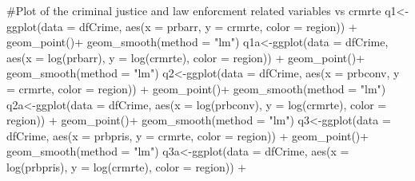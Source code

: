 \documentclass[]{article}
\newenvironment{Shaded}{}{}
\newcommand{\CommentTok}[1]{\textcolor[rgb]{0.00,0.50,0.00}{#1}}
\newcommand{\DataTypeTok}[1]{#1}
\newcommand{\KeywordTok}[1]{\textcolor[rgb]{0.00,0.00,1.00}{#1}}
\newcommand{\NormalTok}[1]{#1}
\newcommand{\OperatorTok}[1]{#1}
\newcommand{\StringTok}[1]{\textcolor[rgb]{0.00,0.50,0.50}{#1}}
\begin{document}
\begin{Shaded}
\begin{Highlighting}[]
\CommentTok{#Plot of the criminal justice and law enforcment related variables vs crmrte}
\NormalTok{q1<-}\KeywordTok{ggplot}\NormalTok{(}\DataTypeTok{data =}\NormalTok{ dfCrime, }\KeywordTok{aes}\NormalTok{(}\DataTypeTok{x =}\NormalTok{ prbarr, }\DataTypeTok{y =}\NormalTok{ crmrte, }\DataTypeTok{color =}\NormalTok{ region)) }\OperatorTok{+}\StringTok{ }
\StringTok{      }\KeywordTok{geom_point}\NormalTok{()}\OperatorTok{+}
\StringTok{  }\KeywordTok{geom_smooth}\NormalTok{(}\DataTypeTok{method =} \StringTok{"lm"}\NormalTok{)}
\NormalTok{q1a<-}\KeywordTok{ggplot}\NormalTok{(}\DataTypeTok{data =}\NormalTok{ dfCrime, }\KeywordTok{aes}\NormalTok{(}\DataTypeTok{x =} \KeywordTok{log}\NormalTok{(prbarr), }\DataTypeTok{y =} \KeywordTok{log}\NormalTok{(crmrte), }\DataTypeTok{color =}\NormalTok{ region)) }\OperatorTok{+}\StringTok{ }
\StringTok{      }\KeywordTok{geom_point}\NormalTok{()}\OperatorTok{+}
\StringTok{  }\KeywordTok{geom_smooth}\NormalTok{(}\DataTypeTok{method =} \StringTok{"lm"}\NormalTok{)}
\NormalTok{q2<-}\KeywordTok{ggplot}\NormalTok{(}\DataTypeTok{data =}\NormalTok{ dfCrime, }\KeywordTok{aes}\NormalTok{(}\DataTypeTok{x =}\NormalTok{ prbconv, }\DataTypeTok{y =}\NormalTok{ crmrte, }\DataTypeTok{color =}\NormalTok{ region)) }\OperatorTok{+}\StringTok{ }
\StringTok{      }\KeywordTok{geom_point}\NormalTok{()}\OperatorTok{+}
\StringTok{  }\KeywordTok{geom_smooth}\NormalTok{(}\DataTypeTok{method =} \StringTok{"lm"}\NormalTok{)}
\NormalTok{q2a<-}\KeywordTok{ggplot}\NormalTok{(}\DataTypeTok{data =}\NormalTok{ dfCrime, }\KeywordTok{aes}\NormalTok{(}\DataTypeTok{x =} \KeywordTok{log}\NormalTok{(prbconv), }\DataTypeTok{y =} \KeywordTok{log}\NormalTok{(crmrte), }\DataTypeTok{color =}\NormalTok{ region)) }\OperatorTok{+}\StringTok{ }
\StringTok{      }\KeywordTok{geom_point}\NormalTok{()}\OperatorTok{+}
\StringTok{  }\KeywordTok{geom_smooth}\NormalTok{(}\DataTypeTok{method =} \StringTok{"lm"}\NormalTok{)}
\NormalTok{q3<-}\KeywordTok{ggplot}\NormalTok{(}\DataTypeTok{data =}\NormalTok{ dfCrime, }\KeywordTok{aes}\NormalTok{(}\DataTypeTok{x =}\NormalTok{ prbpris, }\DataTypeTok{y =}\NormalTok{ crmrte, }\DataTypeTok{color =}\NormalTok{ region)) }\OperatorTok{+}\StringTok{ }
\StringTok{      }\KeywordTok{geom_point}\NormalTok{()}\OperatorTok{+}
\StringTok{  }\KeywordTok{geom_smooth}\NormalTok{(}\DataTypeTok{method =} \StringTok{"lm"}\NormalTok{)}
\NormalTok{q3a<-}\KeywordTok{ggplot}\NormalTok{(}\DataTypeTok{data =}\NormalTok{ dfCrime, }\KeywordTok{aes}\NormalTok{(}\DataTypeTok{x =} \KeywordTok{log}\NormalTok{(prbpris), }\DataTypeTok{y =} \KeywordTok{log}\NormalTok{(crmrte), }\DataTypeTok{color =}\NormalTok{ region)) }\OperatorTok{+}\StringTok{ }

\end{Highlighting}
\end{Shaded}
\end{document}
